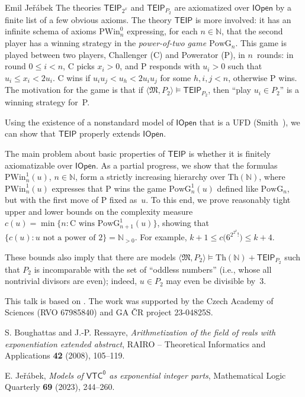 \documentclass[report]{owrart}
\newcommand\p[1]{\langle#1\rangle}
\newcommand\model{\vDash}
\newcommand\N{\mathbb N}
\newcommand\sM{\mathfrak M}
\newcommand\thry[1]{\mathsf{#1}}
\newcommand\io{\thry{IOpen}}
\newcommand\teip{\thry{TEIP}}
\newcommand\teipp{\teip_{\!P_2}}
\newcommand\teipe{\teip_{2^x}}
\newcommand\powg{\mathrm{PowG}}
\newcommand\Th{\mathrm{Th}}
\newcommand\pwin{\mathrm{PWin}}
\begin{document}
\begin{report}
\begin{talk}{Emil Je\v r\'abek}
  The theories $\teipe$ and $\teipp$ are axiomatized over $\io$ by a finite list of a few obvious axioms. The theory
  $\teip$ is more involved: it has an infinite schema of axioms $\pwin^0_n$ expressing, for each $n\in\N$, that the
  second player has a winning strategy in the \emph{power-of-two game $\powg_n$}. This game is played between two
  players, Challenger (C) and Powerator (P), in $n$~rounds: in round $0\le i<n$, C picks $x_i>0$, and P responds with
  $u_i>0$ such that $u_i\le x_i<2u_i$. C wins if $u_iu_j<u_h<2u_iu_j$ for some $h,i,j<n$, otherwise P wins. The
  motivation for the game is that if $\p{\sM,P_2}\model\teipp$, then ``play $u_i\in P_2$'' is a winning strategy for~P.
  
  Using the existence of a nonstandard model of $\io$ that is a UFD (Smith~\cite{EJ:smith}), we can show that
  $\teip$ properly extends $\io$.
  
  The main problem about basic properties of $\teip$ is whether it is finitely axiomatizable over $\io$. As a partial
  progress, we show that the formulas $\pwin^1_n(u)$, $n\in\N$, form a strictly increasing hierarchy over $\Th(\N)$, where
  $\pwin^1_n(u)$ expresses that P wins the game $\powg^1_n(u)$ defined like $\powg_n$, but with the first move of P
  fixed as~$u$. To this end, we prove reasonably tight upper and lower bounds on the complexity measure
  $c(u)=\min\{n:\text{C wins }\powg^1_{n+1}(u)\}$, showing that $\{c(u):u\text{ not a power of }2\}=\N_{>0}$. For
  example, $k+1\le c\bigl(6^{2^{\scriptstyle2^k}\textstyle!}\bigr)\le k+4$.
  
  These bounds also imply that there are models $\p{\sM,P_2}\model\Th(\N)+\teipp$ such that
  $P_2$ is incomparable with the set of ``oddless numbers'' (i.e., whose all nontrivial divisors are even); indeed, $u\in
  P_2$ may even be divisible by~$3$.
  
  This talk is based on \cite{EJ:ej:teip}. The work was supported by the Czech Academy of Sciences (RVO 67985840) and GA
  \v CR project 23-04825S.
  
  \begin{thebibliography}{9}
  
  S. Boughattas and J.-P. Ressayre, \emph{Arithmetization of the field
    of reals with exponentiation extended abstract}, RAIRO -- Theoretical
    Informatics and Applications \textbf{42} (2008), 105--119.
  
  E. Je\v r\'abek, \emph{Models of $\mathsf{VTC^0}$ as exponential
    integer parts}, Mathematical Logic Quarterly \textbf{69} (2023),
    244--260.
  

\end{thebibliography}
\end{talk}
\end{report}
\end{document}
